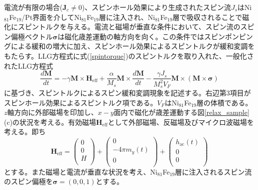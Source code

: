 電流が有限の場合($\bm{J}_c\not=0$)、スピンホール効果により生成されたスピン流$J_s$はNi$_{81}$Fe$_{19}$/Pt界面を介してNi$_{81}$Fe$_{19}$層に注入され、Ni$_{81}$Fe$_{19}$層で吸収されることで磁化にスピントルクを与える。電流と磁場が垂直な条件において、スピン流のスピン偏極ベクトル$\bm{\sigma}$は磁化歳差運動の軸方向を向く。この条件ではスピンポンピングによる緩和の増大に加え、スピンホール効果によるスピントルクが緩和変調をもたらす。LLG方程式に式(\ref{spintorque})のスピントルクを取り入れた、一般化されたLLG方程式\cite{Slonczewski}
\begin{equation}
\frac{d\bm{M}}{dt}=-\gamma\bm{M}\times\bm{H}_\text{eff}+\frac{\alpha}{M_s}\bm{M}\times\frac{d\bm{M}}{dt}-\frac{\gamma J_s}{M_s^2 V_F}\bm{M}\times\left(\bm{M}\times\bm{\sigma}\right)\label{LLGspintorque}
\end{equation}
に基づき、スピントルクによるスピン緩和変調現象を記述する。右辺第3項目がスピンホール効果によるスピントルク項である。$V_F$はNi$_{81}$Fe$_{19}$層の体積である。
$z$軸方向に外部磁場を印加し、$x-y$面内で磁化が歳差運動する図\ref{relax_sample}(c)の状況を考える。有効磁場${\bm H}_\text{eff}$として外部磁場、反磁場及びマイクロ波磁場を考える。即ち
\begin{equation}
{{\bm H}_\text{eff}} = \left( {\begin{array}{*{20}{c}}
   0  \\
   0  \\
   H  \\
\end{array}} \right) + \left( {\begin{array}{*{20}{c}}
   0  \\
   { - 4\pi {m_y}(t)}  \\
   0  \\
\end{array}} \right) + \left( {\begin{array}{*{20}{c}}
   h_\text{ac}(t)  \\
   0  \\
   0  \\
\end{array}} \right)\label{HHH}
\end{equation}
とする。また磁場と電流が垂直な状況を考え、Ni$_{81}$Fe$_{19}$層に注入されるスピン流のスピン偏極を$\bm{\sigma}=(0, 0, 1)$とする。

